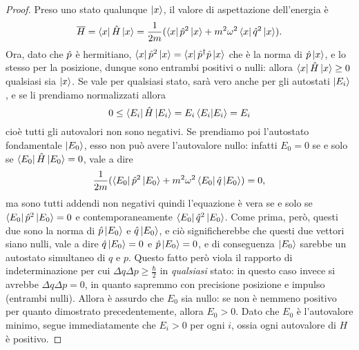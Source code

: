 \begin{proof}
	Preso uno stato qualunque $\left|{x}\right\rangle$, il valore di aspettazione dell'energia è
	\begin{equation}
		\overline{H}=\left\langle{x}\right|\hat{H}\left|{x}\right\rangle=\frac1{2m}(\left\langle{x}\right|\hat{p}^2\left|{x}\right\rangle+m^2\omega^2\left\langle{x}\right|\hat{q}^2\left|{x}\right\rangle).
	\end{equation}
	Ora, dato che $\hat{p}$ è hermitiano, $\left\langle{x}\right|\hat{p}^2\left|{x}\right\rangle=\left\langle{x}\right|{\hat{p}}^\dagger\hat{p}\left|{x}\right\rangle$ che è la norma di $\hat{p}\left|{x}\right\rangle$, e lo stesso per la posizione, dunque sono entrambi positivi o nulli: allora $\left\langle{x}\right|\hat{H}\left|{x}\right\rangle\geq 0$ qualsiasi sia $\left|{x}\right\rangle$.
	Se vale per qualsiasi stato, sarà vero anche per gli autostati $\left|{E_i}\right\rangle$, e se li prendiamo normalizzati allora
	\begin{equation}
		0\leq\left\langle{E_i}\right|\hat{H}\left|{E_i}\right\rangle=E_i\left\langle{E_i}\middle|{E_i}\right\rangle=E_i
	\end{equation}
	cioè tutti gli autovalori non sono negativi.
	Se prendiamo poi l'autostato fondamentale $\left|{E_0}\right\rangle$, esso non può avere l'autovalore nullo: infatti $E_0=0$ se e solo se $\left\langle{E_0}\right|\hat{H}\left|{E_0}\right\rangle=0$, vale a dire
	\begin{equation}
		\frac1{2m}(\left\langle{E_0}\right|\hat{p}^2\left|{E_0}\right\rangle+m^2\omega^2\left\langle{E_0}\right|\hat{q}\left|{E_0}\right\rangle)=0,
	\end{equation}
	ma sono tutti addendi non negativi quindi l'equazione è vera se e solo se $\left\langle{E_0}\right|\hat{p}^2\left|{E_0}\right\rangle=0$ e contemporaneamente $\left\langle{E_0}\right|\hat{q}^2\left|{E_0}\right\rangle$.
	Come prima, però, questi due sono la norma di $\hat{p}\left|{E_0}\right\rangle$ e $\hat{q}\left|{E_0}\right\rangle$, e ciò significherebbe che questi due vettori siano nulli, vale a dire $\hat{q}\left|{E_0}\right\rangle=0$ e $\hat{p}\left|{E_0}\right\rangle=0$, e di conseguenza $\left|{E_0}\right\rangle$ sarebbe un autostato simultaneo di $q$ e $p$.
	Questo fatto però viola il rapporto di indeterminazione per cui $\Delta q\Delta p\geq\frac{\hbar}2$ in \emph{qualsiasi} stato: in questo caso invece si avrebbe $\Delta q\Delta p=0$, in quanto sapremmo con precisione posizione e impulso (entrambi nulli).
	Allora è assurdo che $E_0$ sia nullo: se non è nemmeno positivo per quanto dimostrato precedentemente, allora $E_0>0$.
	Dato che $E_0$ è l'autovalore minimo, segue immediatamente che $E_i>0$ per ogni $i$, ossia ogni autovalore di $H$ è positivo.
\end{proof}

